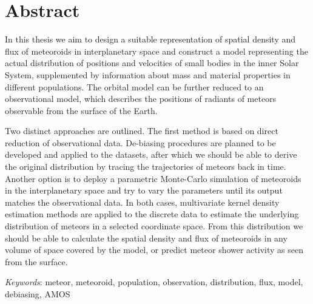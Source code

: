\section*{Abstract}
    In this thesis we aim to design a suitable representation of spatial density
    and flux of meteoroids in interplanetary space and construct a model representing
    the actual distribution of positions and velocities of small bodies in the inner Solar System,
    supplemented by information about mass and material properties in different populations.
    The orbital model can be further reduced to an observational model,
    which describes the positions of radiants of meteors observable from the surface of the Earth.

    Two distinct approaches are outlined.
    The first method is based on direct reduction of observational data.
    De-biasing procedures are planned to be developed and applied to the datasets,
    after which we should be able to derive the original distribution by tracing the trajectories of meteors back in time.
    Another option is to deploy a parametric Monte-Carlo simulation of meteoroids in the interplanetary space
    and try to vary the parameters until its output matches the observational data.
    In both cases, multivariate kernel density estimation methods are applied to the discrete
    data to estimate the underlying distribution of meteors in a selected coordinate space.
    From this distribution we should be able to calculate the spatial density and flux of meteoroids
    in any volume of space covered by the model, or predict meteor shower activity as
    seen from the surface.

    \emph{Keywords}: meteor, meteoroid, population, observation, distribution, flux, model, debiasing, AMOS
